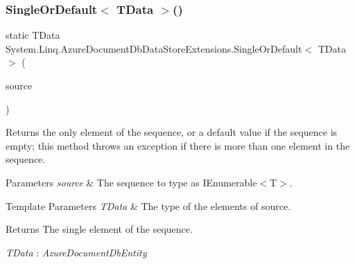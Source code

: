 \subsubsection{\texorpdfstring{Single\+Or\+Default$<$ T\+Data $>$()}{SingleOrDefault< TData >()}\hspace{0.1cm}{\footnotesize\ttfamily [1/2]}}
{\footnotesize\ttfamily static T\+Data System.\+Linq.\+Azure\+Document\+Db\+Data\+Store\+Extensions.\+Single\+Or\+Default$<$ T\+Data $>$ (\begin{DoxyParamCaption}\item[{this \hyperlink{classCqrs_1_1Azure_1_1DocumentDb_1_1DataStores_1_1AzureDocumentDbDataStore}{Azure\+Document\+Db\+Data\+Store}$<$ T\+Data $>$}]{source }\end{DoxyParamCaption})\hspace{0.3cm}{\ttfamily [static]}}



Returns the only element of the sequence, or a default value if the sequence is empty; this method throws an exception if there is more than one element in the sequence. 


\begin{DoxyParams}{Parameters}
{\em source} & The sequence to type as I\+Enumerable$<$\+T$>$.\\
\hline
\end{DoxyParams}

\begin{DoxyTemplParams}{Template Parameters}
{\em T\+Data} & The type of the elements of source.\\
\hline
\end{DoxyTemplParams}
\begin{DoxyReturn}{Returns}
The single element of the sequence.
\end{DoxyReturn}
\begin{Desc}
\item[Type Constraints]\begin{description}
\item[{\em T\+Data} : {\em Azure\+Document\+Db\+Entity}]\end{description}
\end{Desc}
\mbox{\label{classSystem_1_1Linq_1_1AzureDocumentDbDataStoreExtensions_a37c11caa4a5e82f4761bf3b910ee0f15_a37c11caa4a5e82f4761bf3b910ee0f15}} 
